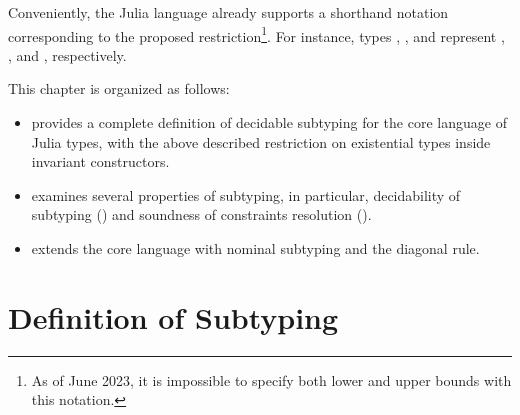 Conveniently, the Julia language already supports a shorthand notation
corresponding to the proposed restriction\footnote{As of June 2023,
it is impossible to specify both lower and upper bounds with this notation.}.
For instance, types , , and 
represent , ,
and , respectively.

This chapter is organized as follows:
\begin{itemize}
    \item {} provides a complete definition
        of decidable subtyping for the core language of Julia types, 
        with the above described restriction
        on existential types inside invariant constructors.
    \item {} examines several properties
        of subtyping, in particular, decidability of subtyping
        () and
        soundness of constraints resolution ().
    \item {} extends the core language with 
        nominal subtyping and the diagonal rule.
\end{itemize}


\section{Definition of Subtyping}%
\label{sec:dec-sub:defs}


